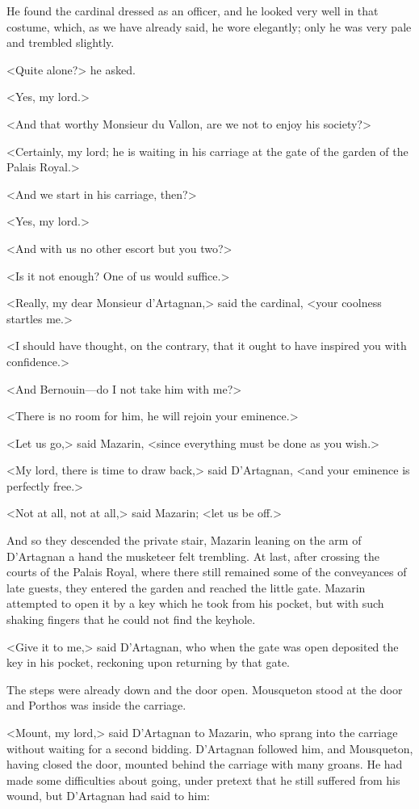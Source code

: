 He found the cardinal dressed as an officer, and he looked very well in that costume, which, as we have already said, he wore elegantly; only he was very pale and trembled slightly.

<Quite alone?> he asked.

<Yes, my lord.>

<And that worthy Monsieur du Vallon, are we not to enjoy his society?>

<Certainly, my lord; he is waiting in his carriage at the gate of the garden of the Palais Royal.>

<And we start in his carriage, then?>

<Yes, my lord.>

<And with us no other escort but you two?>

<Is it not enough? One of us would suffice.>

<Really, my dear Monsieur d'Artagnan,> said the cardinal, <your coolness startles me.>

<I should have thought, on the contrary, that it ought to have inspired you with confidence.>

<And Bernouin—do I not take him with me?>

<There is no room for him, he will rejoin your eminence.>

<Let us go,> said Mazarin, <since everything must be done as you wish.>

<My lord, there is time to draw back,> said D'Artagnan, <and your eminence is perfectly free.>

<Not at all, not at all,> said Mazarin; <let us be off.>

And so they descended the private stair, Mazarin leaning on the arm of D'Artagnan a hand the musketeer felt trembling. At last, after crossing the courts of the Palais Royal, where there still remained some of the conveyances of late guests, they entered the garden and reached the little gate. Mazarin attempted to open it by a key which he took from his pocket, but with such shaking fingers that he could not find the keyhole.

<Give it to me,> said D'Artagnan, who when the gate was open deposited the key in his pocket, reckoning upon returning by that gate.

The steps were already down and the door open. Mousqueton stood at the door and Porthos was inside the carriage.

<Mount, my lord,> said D'Artagnan to Mazarin, who sprang into the carriage without waiting for a second bidding. D'Artagnan followed him, and Mousqueton, having closed the door, mounted behind the carriage with many groans. He had made some difficulties about going, under pretext that he still suffered from his wound, but D'Artagnan had said to him:


